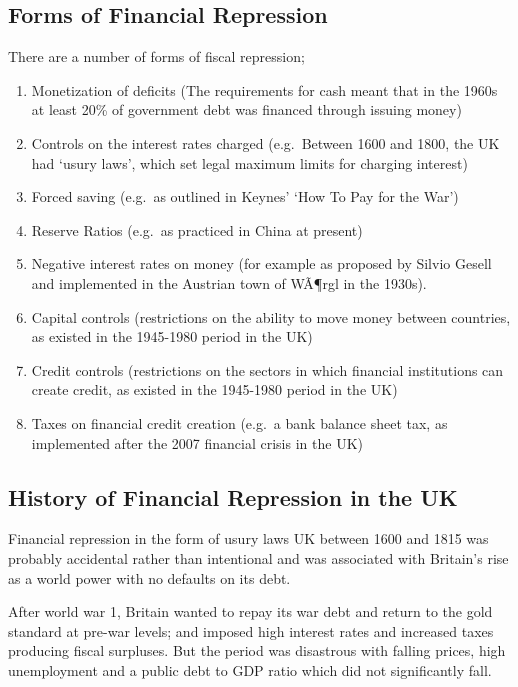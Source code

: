 \documentclass[]{tufte-handout}
\providecommand{\tightlist}{%
  \setlength{\itemsep}{0pt}\setlength{\parskip}{0pt}}
\begin{document}
\hypertarget{forms-of-financial-repression}{%
\subsection{Forms of Financial
Repression}\label{forms-of-financial-repression}}

There are a number of forms of fiscal repression;

\begin{enumerate}
\def\labelenumi{\arabic{enumi}.}
\tightlist
\item
  Monetization of deficits (The requirements for cash meant that in the
  1960s at least 20\% of government debt was financed through issuing
  money)
\item
  Controls on the interest rates charged (e.g.~Between 1600 and 1800,
  the UK had `usury laws', which set legal maximum limits for charging
  interest)
\item
  Forced saving (e.g.~as outlined in Keynes' `How To Pay for the War')
\item
  Reserve Ratios (e.g.~as practiced in China at present)
\item
  Negative interest rates on money (for example as proposed by Silvio
  Gesell and implemented in the Austrian town of WÃ¶rgl in the 1930s).
\item
  Capital controls (restrictions on the ability to move money between
  countries, as existed in the 1945-1980 period in the UK)
\item
  Credit controls (restrictions on the sectors in which financial
  institutions can create credit, as existed in the 1945-1980 period in
  the UK)
\item
  Taxes on financial credit creation (e.g.~a bank balance sheet tax, as
  implemented after the 2007 financial crisis in the UK)
\end{enumerate}

\hypertarget{history-of-financial-repression-in-the-uk}{%
\subsection{History of Financial Repression in the
UK}\label{history-of-financial-repression-in-the-uk}}

Financial repression in the form of usury laws UK between 1600 and 1815
was probably accidental rather than intentional and was associated with
Britain's rise as a world power with no defaults on its debt.

After world war 1, Britain wanted to repay its war debt and return to
the gold standard at pre-war levels; and imposed high interest rates and
increased taxes producing fiscal surpluses. But the period was
disastrous with falling prices, high unemployment and a public debt to
GDP ratio which did not significantly fall.
\end{document}

